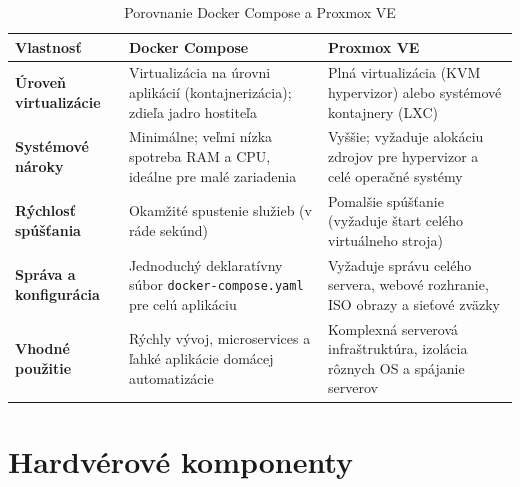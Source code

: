 \begin{table}[ht]
\centering
\small
\renewcommand{\arraystretch}{1.2}
\begin{tabularx}{\textwidth}{@{}
  >{\raggedright\arraybackslash}p{}
  >{\raggedright\arraybackslash}X
  >{\raggedright\arraybackslash}X
@{}}
  \toprule
  \textbf{Vlastnosť} & \textbf{Docker Compose} & \textbf{Proxmox VE} \\
  \midrule
  \textbf{Úroveň virtualizácie} & 
    Virtualizácia na úrovni aplikácií (kontajnerizácia); zdieľa jadro hostiteľa & 
    Plná virtualizácia (KVM hypervizor) alebo systémové kontajnery (LXC) \\
  \textbf{Systémové nároky} & 
    Minimálne; veľmi nízka spotreba RAM a CPU, ideálne pre malé zariadenia & 
    Vyššie; vyžaduje alokáciu zdrojov pre hypervizor a celé operačné systémy \\
  \textbf{Rýchlosť spúšťania} & 
    Okamžité spustenie služieb (v ráde sekúnd) & 
    Pomalšie spúšťanie (vyžaduje štart celého virtuálneho stroja) \\
  \textbf{Správa a konfigurácia} & 
    Jednoduchý deklaratívny súbor \verb|docker-compose.yaml| pre celú aplikáciu & 
    Vyžaduje správu celého servera, webové rozhranie, ISO obrazy a sieťové zväzky \\
  \textbf{Vhodné použitie} & 
    Rýchly vývoj, microservices a ľahké aplikácie domácej automatizácie & 
    Komplexná serverová infraštruktúra, izolácia rôznych OS a spájanie serverov \\
  \bottomrule
\end{tabularx}
\caption{Porovnanie Docker Compose a Proxmox VE}
\label{tab:docker_proxmox_comparison}
\end{table}

\section{Hardvérové komponenty}





